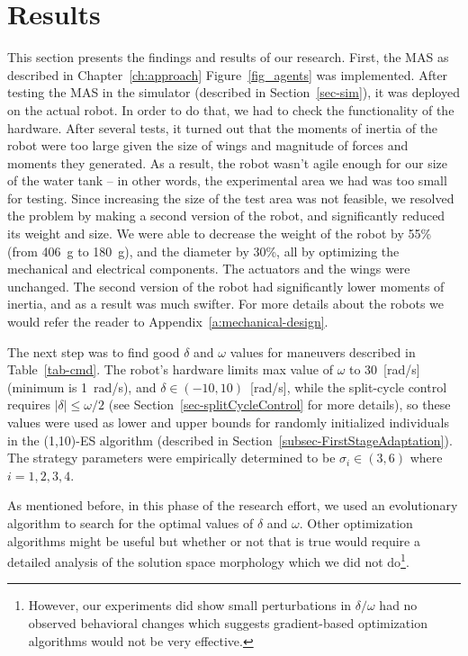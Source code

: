 \chapter{Results}
\label{ch:results}

This section presents the findings and results of our research. First, the MAS as described in Chapter~\ref{ch:approach} Figure~\ref{fig_agents} was implemented. After testing the MAS in the simulator (described in Section~\ref{sec-sim}), it was deployed on the actual robot. In order to do that, we had to check the functionality of the hardware. After several tests, it turned out that the moments of inertia of the robot were too large given the size of wings and magnitude of forces and moments they generated. As a result, the robot wasn't agile enough for our size of the water tank -- in other words, the experimental area we had was too small for testing. Since increasing the size of the test area was not feasible, we resolved the problem by making a second version of the robot, and significantly reduced its weight and size. We were able to decrease the weight of the robot by 55\% (from 406~g to 180~g), and the diameter by 30\%, all by optimizing the mechanical and electrical components. The actuators and the wings were unchanged. The second version of the robot had significantly lower moments of inertia, and as a result was much swifter. For more details about the robots we would refer the reader to Appendix~\ref{a:mechanical-design}. 

The next step was to find good $\delta$ and $\omega$ values for maneuvers described in Table~\ref{tab-cmd}. The robot's hardware limits max value of $\omega$ to 30~[rad/s] (minimum is 1~rad/s), and $\delta \in (-10,10)$~[rad/s], while the split-cycle control requires $|\delta|\le \omega/2$ (see Section~\ref{sec-splitCycleControl} for more details), so these values were used as lower and upper bounds for randomly initialized individuals in the (1,10)-ES algorithm (described in Section~\ref{subsec-FirstStageAdaptation}). The strategy parameters were empirically determined to be $\sigma_i \in (3,6)$ where $i={1,2,3,4}$.

As mentioned before, in this phase of the research effort, we used an evolutionary algorithm to search for the optimal values of $\delta$ and $\omega$. Other optimization algorithms might be useful but whether or not that is true would require a detailed analysis of the solution space morphology which we did not do\footnote{However, our experiments did show small perturbations in $\delta/\omega$ had no observed behavioral changes which suggests gradient-based optimization algorithms would not be very effective.}.

